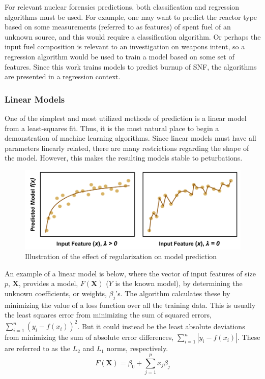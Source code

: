 \setlength\abovedisplayskip{2.5pt}

For relevant nuclear forensics predictions, both classification and regression
algorithms must be used.  For example, one may want to predict the reactor type
based on some measurements (referred to as features) of spent fuel of an
unknown source, and this would require a classification algorithm. Or perhaps
the input fuel composition is relevant to an investigation on weapons intent,
so a regression algorithm would be used to train a model based on some set of
features.  Since this work trains models to predict burnup of \gls{SNF}, the 
algorithms are presented in a regression context.

\subsubsection{Linear Models}
\label{sec:linear}

One of the simplest and most utilized methods of prediction is a linear model
from a least-squares fit. Thus, it is the most natural place to begin a
demonstration of machine learning algorithms. Since linear models must have all
parameters linearly related, there are many restrictions regarding the shape of
the model. However, this makes the resulting models stable to peturbations. 

\begin{figure}[!htb]
  \centering
  \includegraphics[width=\linewidth]{./chapters/litrev/regularization.png}
  \caption{Illustration of the effect of regularization on model prediction}
  \label{fig:reg}
\end{figure}

An example of a linear model is below, where the vector of input features of
size $p$, $\boldsymbol{X}$, provides a model, $F(\boldsymbol{X})$ ($Y$ is the
known model), by determining the unknown coefficients, or weights,
$\beta_{j}$'s. The algorithm calculates these by minimizing the value of a loss
function over all the training data.  This is usually the least squares error
from minimizing the sum of squared errors, $\sum_{i=1}^{n} (y_i - f(x_i))^2$.
But it could instead be the least absolute deviations from minimizing the sum
of absolute error differences, $\sum_{i=1}^{n} |y_i - f(x_i)|$. These are
referred to as the $L_2$ and $L_1$ norms, respectively.  
\begin{equation}
  F(\boldsymbol{X}) = \beta_{0} +  \sum_{j=1}^{p} x_{j} \beta_{j}
\end{equation}

